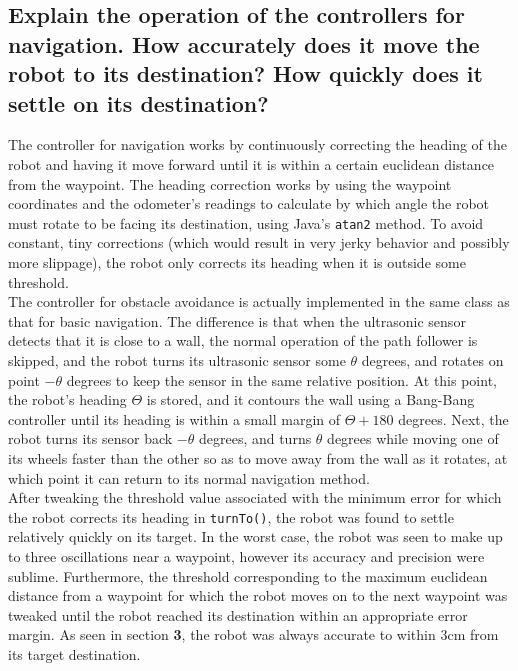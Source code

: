 \documentclass[11pt]{article}
\begin{document}
\subsection{Explain the operation of the controllers for navigation. How accurately does it move the
robot to its destination? How quickly does it settle on its destination?}
The controller for navigation works by continuously correcting the heading of the robot and having
it move forward until it is within a certain euclidean distance from the waypoint. The heading
correction works by using the waypoint coordinates and the odometer's
readings to calculate by which angle the robot must rotate to be facing its destination, using
Java's \texttt{atan2} method. To avoid
constant, tiny corrections (which would result in very jerky behavior and possibly more slippage),
the robot only corrects its heading when it is outside some threshold. \\
The controller for obstacle avoidance is actually implemented in the same class as that for basic
navigation. The difference is that when the ultrasonic sensor detects that it is close to a wall,
the normal operation of the path follower is skipped, and the robot turns its ultrasonic sensor some
$\theta$ degrees, and rotates on point $-\theta$ degrees to keep the sensor in the same relative
position. At this point, the robot's heading $\Theta$ is stored, and it contours the wall using a
Bang-Bang controller until its heading is within a small margin of $\Theta + 180$ degrees. Next, the
robot turns its sensor back $-\theta$ degrees, and turns $\theta$ degrees while moving one of its
wheels faster than the other so as to move away from the wall as it rotates, at which point it can
return to its normal navigation method.\\
After tweaking the threshold value associated with the minimum error for which the robot corrects
its heading in \texttt{turnTo()}, the robot was found to settle relatively quickly on its target. In
the worst case, the robot was seen to make up to three oscillations near a waypoint, however its
accuracy and precision were sublime. Furthermore, the threshold corresponding to the maximum
euclidean distance from a waypoint for which the robot moves on to the next waypoint was tweaked
until the robot reached its destination within an appropriate error margin. As seen in section
\textbf{3}, the robot was always accurate to within 3cm from its target destination.

\end{document}
